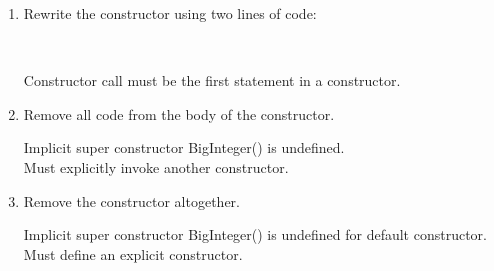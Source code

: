 \begin{enumerate}

\item Rewrite the constructor using two lines of code:

 \\

\begin{answer}[2em]
Constructor call must be the first statement in a constructor.
\end{answer}

\item Remove all code from the body of the constructor.

\begin{answer}[3em]
Implicit super constructor BigInteger() is undefined.
\\ Must explicitly invoke another constructor.
\end{answer}

\item Remove the constructor altogether.

\begin{answer}[3em]
Implicit super constructor BigInteger() is undefined for default constructor.
\\ Must define an explicit constructor.
\end{answer}

\end{enumerate}
